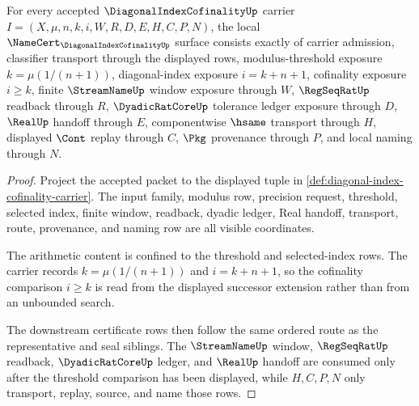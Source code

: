 \begin{theorem}
\label{thm:diagonal-index-cofinality-namecert-obligation-surface}
For every accepted $\DiagonalIndexCofinalityUp$ carrier $I=(X,\mu,n,k,i,W,R,D,E,H,C,P,N)$, the local $\NameCert_{\DiagonalIndexCofinalityUp}$ surface consists exactly of carrier admission, classifier transport through the displayed rows, modulus-threshold exposure $k=\mu(1/(n+1))$, diagonal-index exposure $i=k+n+1$, cofinality exposure $i\geq k$, finite $\StreamNameUp$ window exposure through $W$, $\RegSeqRatUp$ readback through $R$, $\DyadicRatCoreUp$ tolerance ledger exposure through $D$, $\RealUp$ handoff through $E$, componentwise $\hsame$ transport through $H$, displayed $\Cont$ replay through $C$, $\Pkg$ provenance through $P$, and local naming through $N$.
\end{theorem}
\begin{proof}
Project the accepted packet to the displayed tuple in \autoref{def:diagonal-index-cofinality-carrier}. The input family, modulus row, precision request, threshold, selected index, finite window, readback, dyadic ledger, Real handoff, transport, route, provenance, and naming row are all visible coordinates.

The arithmetic content is confined to the threshold and selected-index rows. The carrier records $k=\mu(1/(n+1))$ and $i=k+n+1$, so the cofinality comparison $i\geq k$ is read from the displayed successor extension rather than from an unbounded search.

The downstream certificate rows then follow the same ordered route as the representative and seal siblings. The $\StreamNameUp$ window, $\RegSeqRatUp$ readback, $\DyadicRatCoreUp$ ledger, and $\RealUp$ handoff are consumed only after the threshold comparison has been displayed, while $H,C,P,N$ only transport, replay, source, and name those rows.
\end{proof}


